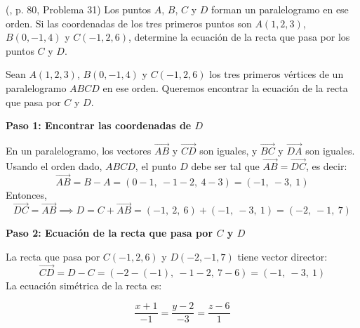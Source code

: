 \begin{prob} (\cite{espinoza2006Algebralineal}, p. 80, Problema 31) Los puntos $A$, $B$, $C$ y $D$ forman un paralelogramo en ese orden. Si las coordenadas de los tres primeros puntos son $A(1,2,3)$, $B(0,-1,4)$ y $C(-1,2,6)$, determine la ecuación de la recta que pasa por los puntos $C$ y $D$. 

\begin{myproof}
Sean $A(1,2,3)$, $B(0,-1,4)$ y $C(-1,2,6)$ los tres primeros vértices de un paralelogramo $ABCD$ en ese orden. Queremos encontrar la ecuación de la recta que pasa por $C$ y $D$.

\textbf{Paso 1: Encontrar las coordenadas de $D$}

En un paralelogramo, los vectores $\overrightarrow{AB}$ y $\overrightarrow{CD}$ son iguales, y $\overrightarrow{BC}$ y $\overrightarrow{DA}$ son iguales. Usando el orden dado, $ABCD$, el punto $D$ debe ser tal que $\overrightarrow{AB} = \overrightarrow{DC}$, es decir:
\[
\overrightarrow{AB} = B - A = (0-1,\ -1-2,\ 4-3) = (-1,\ -3,\ 1)
\]
Entonces,
\[
\overrightarrow{DC} = \overrightarrow{AB} \implies D = C + \overrightarrow{AB} = (-1,\ 2,\ 6) + (-1,\ -3,\ 1) = (-2,\ -1,\ 7)
\]

\textbf{Paso 2: Ecuación de la recta que pasa por $C$ y $D$}

La recta que pasa por $C(-1,2,6)$ y $D(-2,-1,7)$ tiene vector director:
\[
\overrightarrow{CD} = D - C = (-2 - (-1),\ -1 - 2,\ 7 - 6) = (-1,\ -3,\ 1)
\]
La ecuación simétrica de la recta es:

\[
\boxed{
\frac{x + 1}{-1} = \frac{y - 2}{-3} = \frac{z - 6}{1}
}
\]
\end{myproof}

\end{prob}

